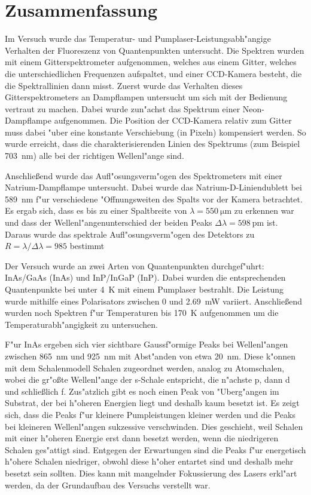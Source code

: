 \section{Zusammenfassung}
Im Versuch wurde das Temperatur- und Pumplaser-Leistungsabh"angige Verhalten der Fluoreszenz von Quantenpunkten untersucht.
Die Spektren wurden mit einem Gitterspektrometer aufgenommen, welches aus einem Gitter, welches die unterschiedlichen Frequenzen aufspaltet, und einer CCD-Kamera besteht, die die Spektrallinien dann misst.
Zuerst wurde das Verhalten dieses Gitterspektrometers an Dampflampen untersucht um sich mit der Bedienung vertraut zu machen.
Dabei wurde zun"achst das Spektrum einer Neon-Dampflampe aufgenommen.
Die Position der CCD-Kamera relativ zum Gitter muss dabei "uber eine konstante Verschiebung (in Pixeln) kompensiert werden.
So wurde erreicht, dass die charakterisierenden Linien des Spektrums (zum Beispiel \SI{703}{nm}) alle bei der richtigen Wellenl"ange sind.

Anschlie\ss end wurde das Aufl"osungsverm"ogen des Spektrometers mit einer Natrium-Dampflampe untersucht.
Dabei wurde das Natrium-D-Liniendublett bei \SI{589}{nm} f"ur verschiedene "Offnungsweiten des Spalts vor der Kamera betrachtet.
Es ergab sich, dass es bis zu einer Spaltbreite von $\lambda=\SI{550}{\micro\metre}$ zu erkennen war und dass der Wellenl"angenunterschied der beiden Peaks $\Delta\lambda=\SI{598}{\pico\metre}$ ist.
Daraus wurde das spektrale Aufl"osungsverm"ogen des Detektors zu $R=\lambda/\Delta\lambda =985$ bestimmt

Der Versuch wurde an zwei Arten von Quantenpunkten durchgef"uhrt: InAs/GaAs (InAs) und InP/InGaP (InP).
Dabei wurden die entsprechenden Quantenpunkte bei unter \SI{4}{\kelvin} mit einem Pumplaser bestrahlt.
Die Leistung wurde mithilfe eines Polarisators zwischen 0 und \SI{2.69}{\milli\watt} variiert.
Anschlie\ss end wurden noch Spektren f"ur Temperaturen bis \SI{170}{\kelvin} aufgenommen um die Temperaturabh"angigkeit zu untersuchen.

F"ur InAs ergeben sich vier sichtbare Gaussf"ormige Peaks bei Wellenl"angen zwischen \SI{865}{nm} und \SI{925}{nm} mit Abst"anden von etwa \SI{20}{nm}.
Diese k"onnen mit dem Schalenmodell Schalen zugeordnet werden, analog zu Atomschalen, wobei die gr"o{\ss}te Wellenl"ange der s-Schale entspricht, die n"achste p, dann d und schlie{\ss}lich f.
Zus"atzlich gibt es noch einen Peak von "Uberg"angen im Substrat, der bei h"oheren Energien liegt und deshalb kaum besetzt ist.
Es zeigt sich, dass die Peaks f"ur kleinere Pumpleistungen kleiner werden und die Peaks bei kleineren Wellenl"angen sukzessive verschwinden.
Dies geschieht, weil Schalen mit einer h"oheren Energie erst dann besetzt werden, wenn die niedrigeren Schalen ges"attigt sind.
Entgegen der Erwartungen sind die Peaks f"ur energetisch h"ohere Schalen niedriger, obwohl diese h"oher entartet sind und deshalb mehr besetzt sein sollten.
Dies kann mit mangelnder Fokussierung des Lasers erkl"art werden, da der Grundaufbau des Versuchs verstellt war.

